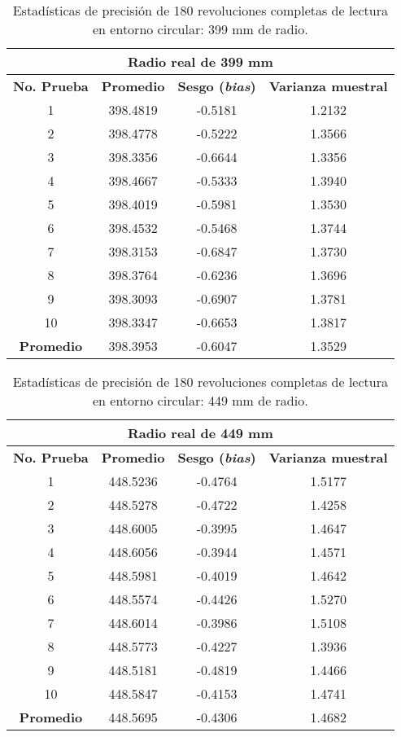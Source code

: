 \begin{table}[H]
	\centering
	\begin{tabular}{|c|c|c|c|}
		\hline
		\multicolumn{4}{|c|}{\textbf{Radio real de 399 mm}} \\ \hline
		\textbf{No. Prueba} & \textbf{Promedio} & \textbf{Sesgo (\textit{bias})} & \textbf{Varianza muestral} \\ \hline
		1 & 398.4819 & -0.5181 & 1.2132 \\ 
		2 & 398.4778 & -0.5222 & 1.3566 \\ 
		3 & 398.3356 & -0.6644 & 1.3356 \\ 
		4 & 398.4667 & -0.5333 & 1.3940 \\ 
		5 & 398.4019 & -0.5981 & 1.3530 \\ 
		6 & 398.4532 & -0.5468 & 1.3744 \\ 
		7 & 398.3153 & -0.6847 & 1.3730 \\ 
		8 & 398.3764 & -0.6236 & 1.3696 \\ 
		9 & 398.3093 & -0.6907 & 1.3781 \\ 
		10 & 398.3347 & -0.6653 & 1.3817 \\ \hline
		\textbf{Promedio} & 398.3953 & -0.6047 & 1.3529 \\ \hline
	\end{tabular}
	\caption{Estadísticas de precisión de 180 revoluciones completas de lectura en entorno circular: 399 mm de radio.}
	\label{fig:tabla_dists6}
\end{table}

\begin{table}[H]
	\centering
	\begin{tabular}{|c|c|c|c|}
		\hline
		\multicolumn{4}{|c|}{\textbf{Radio real de 449 mm}} \\ \hline
		\textbf{No. Prueba} & \textbf{Promedio} & \textbf{Sesgo (\textit{bias})} & \textbf{Varianza muestral} \\ \hline
		1 & 448.5236 & -0.4764 & 1.5177 \\ 
		2 & 448.5278 & -0.4722 & 1.4258 \\ 
		3 & 448.6005 & -0.3995 & 1.4647 \\ 
		4 & 448.6056 & -0.3944 & 1.4571 \\ 
		5 & 448.5981 & -0.4019 & 1.4642 \\ 
		6 & 448.5574 & -0.4426 & 1.5270 \\ 
		7 & 448.6014 & -0.3986 & 1.5108 \\ 
		8 & 448.5773 & -0.4227 & 1.3936 \\ 
		9 & 448.5181 & -0.4819 & 1.4466 \\
		10 & 448.5847 & -0.4153 & 1.4741 \\ \hline
		\textbf{Promedio} & 448.5695 & -0.4306 & 1.4682 \\ \hline
	\end{tabular}
	\caption{Estadísticas de precisión de 180 revoluciones completas de lectura en entorno circular: 449 mm de radio.}
	\label{fig:tabla_dists7}
\end{table}

